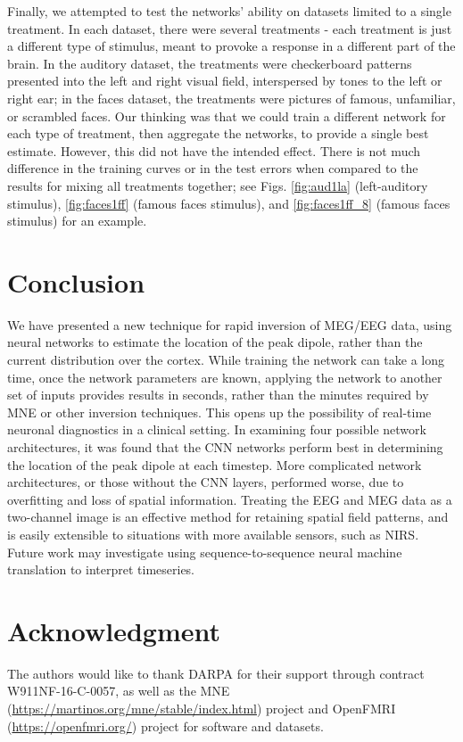 \documentclass[journal]{IEEEtran}
\begin{document}
Finally, we attempted to test the networks' ability on datasets limited to a single treatment. In each dataset, there were several treatments - each treatment is just a different type of stimulus, meant to provoke a response in a different part of the brain. In the auditory dataset, the treatments were checkerboard patterns presented into the left and right visual field, interspersed by tones to the left or right ear; in the faces dataset, the treatments were pictures of famous, unfamiliar, or scrambled faces. Our thinking was that we could train a different network for each type of treatment, then aggregate the networks, to provide a single best estimate. However, this did not have the intended effect. There is not much difference in the training curves or in the test errors when compared to the results for mixing all treatments together; see Figs. \ref{fig:aud1la} (left-auditory stimulus), \ref{fig:faces1ff} (famous faces stimulus), and \ref{fig:faces1ff_8} (famous faces stimulus) for an example.


\section{Conclusion}
We have presented a new technique for rapid inversion of MEG/EEG data, using neural networks to estimate the location of the peak dipole, rather than the current distribution over the cortex. While training the network can take a long time, once the network parameters are known, applying the network to another set of inputs provides results in seconds, rather than the minutes required by MNE or other inversion techniques. This opens up the possibility of real-time neuronal diagnostics in a clinical setting. In examining four possible network architectures, it was found that the CNN networks perform best in determining the location of the peak dipole at each timestep. More complicated network architectures, or those without the CNN layers, performed worse, due to overfitting and loss of spatial information. Treating the EEG and MEG data as a two-channel image is an effective method for retaining spatial field patterns, and is easily extensible to situations with more available sensors, such as NIRS. Future work may investigate using sequence-to-sequence neural machine translation to interpret timeseries.


\section*{Acknowledgment}
The authors would like to thank DARPA for their support through contract W911NF-16-C-0057, as well as the MNE (\url{https://martinos.org/mne/stable/index.html}) project and OpenFMRI (\url{https://openfmri.org/}) project for software and datasets.
\end{document}
